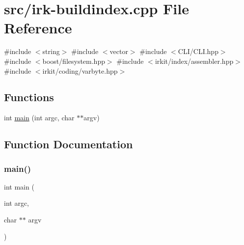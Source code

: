 \hypertarget{irk-buildindex_8cpp}{}\section{src/irk-\/buildindex.cpp File Reference}
\label{irk-buildindex_8cpp}
{\ttfamily \#include $<$string$>$}\newline
{\ttfamily \#include $<$vector$>$}\newline
{\ttfamily \#include $<$C\+L\+I/\+C\+L\+I.\+hpp$>$}\newline
{\ttfamily \#include $<$boost/filesystem.\+hpp$>$}\newline
{\ttfamily \#include $<$irkit/index/assembler.\+hpp$>$}\newline
{\ttfamily \#include $<$irkit/coding/varbyte.\+hpp$>$}\newline
\subsection*{Functions}
\begin{DoxyCompactItemize}
\item 
int \mbox{\hyperlink{irk-buildindex_8cpp_a3c04138a5bfe5d72780bb7e82a18e627}{main}} (int argc, char $\ast$$\ast$argv)
\end{DoxyCompactItemize}


\subsection{Function Documentation}
\mbox{\label{irk-buildindex_8cpp_a3c04138a5bfe5d72780bb7e82a18e627}} 
\subsubsection{\texorpdfstring{main()}{main()}}
{\footnotesize\ttfamily int main (\begin{DoxyParamCaption}\item[{int}]{argc,  }\item[{char $\ast$$\ast$}]{argv }\end{DoxyParamCaption})}

